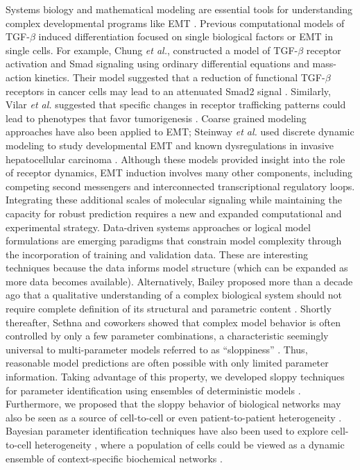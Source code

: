 \documentclass[11pt,letterpaper]{article}
\begin{document}
Systems biology and mathematical modeling are essential tools for understanding complex developmental programs like EMT \cite{Ahmed:2007mi}.
Previous computational models of TGF-$\beta$ induced differentiation focused on single biological factors or EMT in single cells.
For example, Chung \emph{et al.}, constructed a model of TGF-$\beta$ receptor activation and Smad signaling using ordinary differential equations and mass-action kinetics.
Their model suggested that a reduction of functional TGF-$\beta$ receptors in cancer cells may lead to an attenuated Smad2 signal \cite{Chung:2009jl}.
Similarly, Vilar \emph{et al.} suggested that specific changes in receptor trafficking patterns could lead to phenotypes that favor tumorigenesis \cite{Vilar:2006gb}.
Coarse grained modeling approaches have also been applied to EMT; Steinway \emph{et al.} used discrete dynamic modeling to study developmental EMT and known dysregulations in invasive hepatocellular carcinoma \cite{Steinway:2014aa}.
Although these models provided insight into the role of receptor dynamics, EMT induction involves many other components, including competing second messengers and interconnected transcriptional regulatory loops.
Integrating these additional scales of molecular signaling while maintaining the capacity for robust prediction requires a new and expanded computational and experimental strategy.
Data-driven systems approaches \cite{Cirit:2012kx} or logical model formulations \cite{Morris:2011ys} are emerging paradigms that constrain model complexity through the incorporation of training and validation data.
These are interesting techniques because the data informs model structure (which can be expanded as more data becomes available).
Alternatively, Bailey proposed more than a decade ago that a qualitative understanding of a complex biological system should not require complete definition of its structural and parametric content \cite{2001_bailey_NatBiotech}.
Shortly thereafter, Sethna and coworkers showed that complex model behavior is often controlled by only a few parameter combinations, a characteristic seemingly universal to multi-parameter models referred to as ``sloppiness'' \cite{Machta:2013by}.
Thus, reasonable model predictions are often possible with only limited parameter information.
Taking advantage of this property, we developed sloppy techniques for parameter identification using ensembles of deterministic models \cite{Song:2010fk}.
Furthermore, we proposed that the sloppy behavior of biological networks may also be seen as a source of cell-to-cell \cite{Lequieu:2011fj} or even patient-to-patient heterogeneity \cite{2010_luan_varner_MolBioSys}.
Bayesian parameter identification techniques have also been used to explore cell-to-cell heterogeneity  \cite{2011_kalita_brasier_JBC,2011_hasenauer_allgower_BMCBioinfo},
where a population of cells could be viewed as a dynamic ensemble of context-specific biochemical networks \cite{2012_creixell_linding_NatBiotech}.
\end{document}
